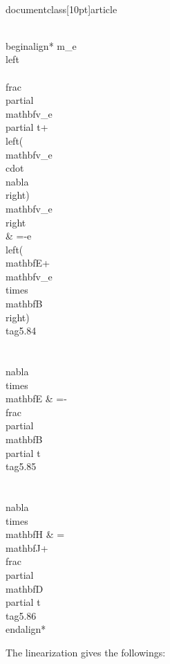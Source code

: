 \\documentclass[10pt]{article}
\begin{document}
{{{{\\begin{align*}
m_{e}\\left\\{\\frac{\\partial \\mathbf{v}_{e}}{\\partial t}+\\left(\\mathbf{v}_{e} \\cdot \\nabla\\right) \\mathbf{v}_{e}\\right\\} & =-e\\left(\\mathbf{E}+\\mathbf{v}_{e} \\times \\mathbf{B}\\right)  \\tag{5.84}\\\\
\\nabla \\times \\mathbf{E} & =-\\frac{\\partial \\mathbf{B}}{\\partial t}  \\tag{5.85}\\\\
\\nabla \\times \\mathbf{H} & =\\mathbf{J}+\\frac{\\partial \\mathbf{D}}{\\partial t} \\tag{5.86}
\\end{align*}


The linearization gives the followings:


}}}}
\end{document}
